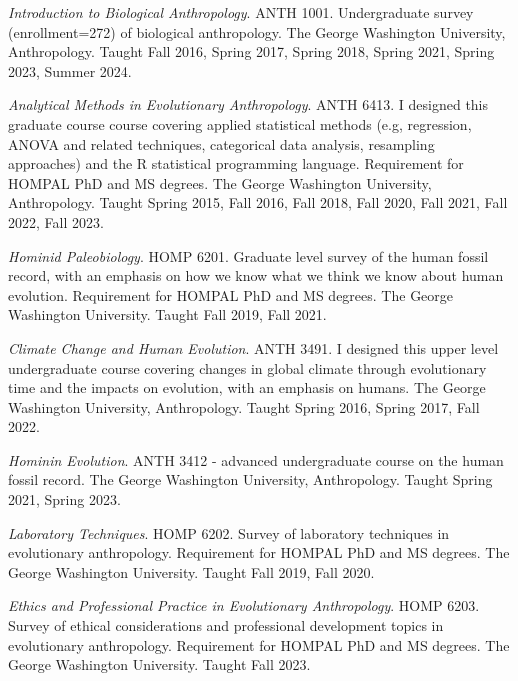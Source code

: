 \documentclass{article}
\newenvironment{mylist}
{\begin{description}[style=unboxed,leftmargin=1.3cm]}
{\end{description}}
\begin{document}
\begin{mylist}

\item[]\emph{Introduction to Biological Anthropology}. ANTH 1001. Undergraduate survey (enrollment=272) of biological anthropology. The George Washington University, Anthropology. Taught Fall 2016, Spring 2017, Spring 2018, Spring 2021, Spring 2023, Summer 2024.

\item[] \emph{Analytical Methods in Evolutionary Anthropology}. ANTH 6413. I designed this graduate course course covering applied statistical methods (e.g, regression, ANOVA and related techniques, categorical data analysis, resampling approaches) and the R statistical programming language. Requirement for HOMPAL PhD and MS degrees. The George Washington University, Anthropology. Taught Spring 2015, Fall 2016, Fall 2018, Fall 2020, Fall 2021, Fall 2022, Fall 2023. 

\item[] \emph{Hominid Paleobiology}. HOMP 6201. Graduate level survey of the human fossil record, with an emphasis on how we know what we think we know about human evolution. Requirement for HOMPAL PhD and MS degrees.    The George Washington University. Taught Fall 2019, Fall 2021. 

\item[] \emph{Climate Change and Human Evolution}. ANTH 3491. I designed this upper level undergraduate course covering changes in global climate through evolutionary time and the impacts on evolution, with an emphasis on humans. The George Washington University, Anthropology. Taught Spring 2016, Spring 2017, Fall 2022.

\item[] \emph{Hominin Evolution}. ANTH 3412 - advanced undergraduate course on the human fossil record. The George Washington University, Anthropology. Taught Spring 2021, Spring 2023.

\item[] \emph{Laboratory Techniques}. HOMP 6202. Survey of laboratory techniques in evolutionary anthropology. Requirement for HOMPAL PhD and MS degrees. The George Washington University. Taught Fall 2019, Fall 2020. 

\item[] \emph{Ethics and Professional Practice in Evolutionary Anthropology}. HOMP 6203. Survey of ethical considerations and professional development topics in evolutionary anthropology. Requirement for HOMPAL PhD and MS degrees. The George Washington University. Taught Fall 2023.


\end{mylist}
\end{document}

